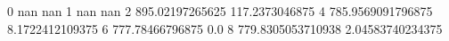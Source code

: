 0 nan nan
1 nan nan
2 895.02197265625 117.2373046875
4 785.9569091796875 8.1722412109375
6 777.78466796875 0.0
8 779.8305053710938 2.04583740234375
